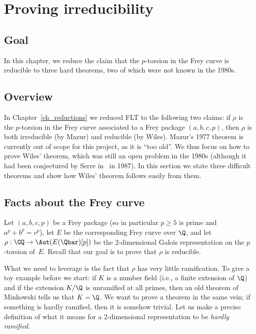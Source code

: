 \chapter{Proving irreducibility}\label{ch_freyreduction}

\section{Goal}

In this chapter, we reduce the claim that the $p$-torsion in the Frey
curve is reducible to three hard theorems, two of which were not known
in the 1980s.

\section{Overview}

In Chapter~\ref{ch_reductions} we reduced FLT to the
following two claims: if $\rho$ is the $p$-torsion in the Frey curve
associated to a Frey package $(a,b,c,p)$, then $\rho$ is both
irreducible (by Mazur) and reducible (by Wiles). Mazur's 1977 theorem
is currently out of scope for this project, as it is ``too old''.
We thus focus on how to prove Wiles' theorem, which was still an open problem
in the 1980s (although it had been conjectured by Serre in~\cite{serreconj}
in 1987). In this section we state three difficult theorems and
show how Wiles' theorem follows easily from them.

\section{Facts about the Frey curve}

Let $(a,b,c,p)$ be a Frey package (so in particular $p\geq5$ is prime and $a^p+b^p=c^p$),
let $E$ be the corresponding Frey curve over $\Q$, and let $\rho:\GQ\to\Aut(E(\Qbar)[p])$
be the 2-dimensional Galois representation on the $p$-torsion of~$E$. Recall that our goal
is to prove that $\rho$ is reducible.

What we need to leverage is the fact that $\rho$ has very little ramification. To give
a toy example before we start: if $K$ is a number field (i.e., a finite extension of $\Q$)
and if the extension $K/\Q$ is unramified at all primes, then an old theorem of
Minkowski tells us that $K=\Q$. We want to prove a theorem in the same vein; if
something is hardly ramified, then it is somehow trivial. Let us make a precise
definition of what it means for a 2-dimensional representation to be \emph{hardly ramified}.

